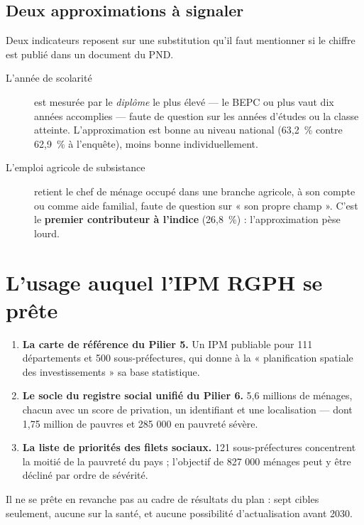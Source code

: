 \documentclass[11pt,a4paper]{article}
\begin{document}
\subsection{Deux approximations à signaler}

Deux indicateurs reposent sur une substitution qu'il faut mentionner si le chiffre est publié dans
un document du PND.

\begin{description}
  \item[L'année de scolarité] est mesurée par le \emph{diplôme} le plus élevé --- le BEPC ou plus
    vaut dix années accomplies --- faute de question sur les années d'études ou la classe atteinte.
    L'approximation est bonne au niveau national (63,2~\% contre 62,9~\% à l'enquête), moins bonne
    individuellement.
  \item[L'emploi agricole de subsistance] retient le chef de ménage occupé dans une branche
    agricole, à son compte ou comme aide familial, faute de question sur « son propre champ ».
    C'est le \textbf{premier contributeur à l'indice} (26,8~\%) : l'approximation pèse lourd.
\end{description}

\section{L'usage auquel l'IPM RGPH se prête}

\begin{retenir}
\begin{enumerate}
  \item \textbf{La carte de référence du Pilier 5.} Un IPM publiable pour 111 départements et 500
        sous-préfectures, qui donne à la « planification spatiale des investissements » sa base
        statistique.
  \item \textbf{Le socle du registre social unifié du Pilier 6.} 5,6 millions de ménages, chacun
        avec un score de privation, un identifiant et une localisation — dont 1,75 million de
        pauvres et 285 000 en pauvreté sévère.
  \item \textbf{La liste de priorités des filets sociaux.} 121 sous-préfectures concentrent la
        moitié de la pauvreté du pays ; l'objectif de 827 000 ménages peut y être décliné par ordre
        de sévérité.
\end{enumerate}
\end{retenir}

Il ne se prête en revanche pas au cadre de résultats du plan : sept cibles seulement, aucune sur la
santé, et aucune possibilité d'actualisation avant 2030.
\end{document}
